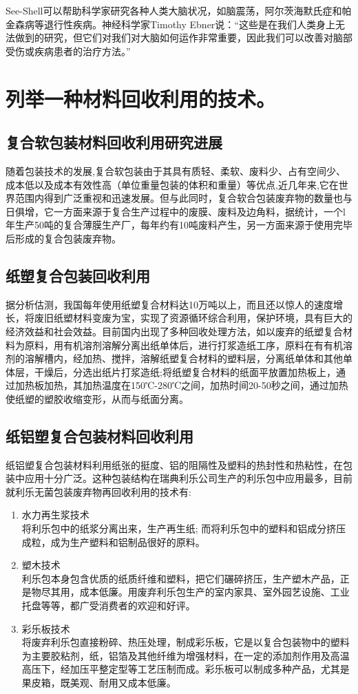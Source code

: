 \documentclass[UTF8,9pt]{ctexart}
\newcommand\se{\section}                                               %
\newcommand\sub{\subsection}                                           %
\newcommand{\rk}[1]{\begin{enumerate}                              %
        #1
    \end{enumerate}}
\begin{document}
See-Shell可以帮助科学家研究各种人类大脑状况，如脑震荡，阿尔茨海默氏症和帕金森病等退行性疾病。神经科学家Timothy Ebner说：“这些是在我们人类身上无法做到的研究，但它们对我们对大脑如何运作非常重要，因此我们可以改善对脑部受伤或疾病患者的治疗方法。”
\se{列举一种材料回收利用的技术。}
\sub{复合软包装材料回收利用研究进展}
随着包装技术的发展,复合软包装由于其具有质轻、柔软、废料少、占有空间少、成本低以及成本有效性高（单位重量包装的体积和重量）等优点,近几年来,它在世界范围内得到广泛重视和迅速发展。但与此同时，复合软合包装废弃物的数量也与日俱增，它一方面来源于复合生产过程中的废膜、废料及边角料，据统计，一个l年生产50吨的复合薄膜生产厂，每年约有10吨废料产生，另一方面来源于使用完毕后形成的复合包装废弃物。
\sub{纸塑复合包装回收利用}
据分析估测，我国每年使用纸塑复合材料达10万吨以上，而且还以惊人的速度增长，将废旧纸塑材料变废为宝，实现了资源循环综合利用，保护环境，具有巨大的经济效益和社会效益。目前国内出现了多种回收处理方法，如以废弃的纸塑复合材料为原料，用有机溶剂溶解分离出纸单体后，进行打浆造纸工序，原料在有有机溶剂的溶解槽内，经加热、搅拌，溶解纸塑复合材料的塑料层，分离纸单体和其他单体层，干燥后，分选出纸片打浆造纸;将纸塑复合材料的纸面平放置加热板上，通过加热板加热，其加热温度在150℃-280℃之间，加热时间20-50秒之间，通过加热使纸塑的塑胶收缩变形，从而与纸面分离。
\sub{纸铝塑复合包装材料回收利用}
纸铝塑复合包装材料利用纸张的挺度、铝的阻隔性及塑料的热封性和热粘性，在包装中应用十分广泛。这种包装结构在瑞典利乐公司生产的利乐包中应用最多，目前就利乐无菌包装废弃物再回收利用的技术有: \rk{
    \item 水力再生浆技术\\
    将利乐包中的纸浆分离出来，生产再生纸; 而将利乐包中的塑料和铝成分挤压成粒，成为生产塑料和铝制品很好的原料。
    \item 塑木技术\\
    利乐包本身包含优质的纸质纤维和塑料，把它们碾碎挤压，生产塑木产品，正是物尽其用，成本低廉。用废弃利乐包生产的室内家具、室外园艺设施、工业托盘等等，都广受消费者的欢迎和好评。
    \item 彩乐板技术\\
    将废弃利乐包直接粉碎、热压处理，制成彩乐板，它是以复合包装物中的塑料为主要胶粘剂，纸，铝箔及其他纤维为增强材料，在一定的添加剂作用及高温高压下，经加压平整定型等工艺压制而成。彩乐板可以制成多种产品，尤其是果皮箱，既美观、耐用又成本低廉。
}
\end{document}
